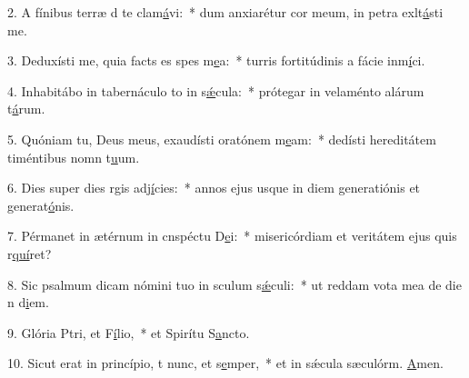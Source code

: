 2. A fínibus terræ d te clam\uline{á}vi:~* dum anxiarétur cor meum, in petra exlt\uline{á}sti me.\par 
3. Deduxísti me, quia facts es spes m\uline{e}a:~* turris fortitúdinis a fácie inm\uline{í}ci.\par 
4. Inhabitábo in tabernáculo to in s\uline{ǽ}cula:~* prótegar in velaménto alárum t\uline{á}rum.\par 
5. Quóniam tu, Deus meus, exaudísti oratónem m\uline{e}am:~* dedísti hereditátem timéntibus nomn t\uline{u}um.\par 
6. Dies super dies rgis adj\uline{í}cies:~* annos ejus usque in diem generatiónis et generat\uline{ó}nis.\par 
7. Pérmanet in ætérnum in cnspéctu D\uline{e}i:~* misericórdiam et veritátem ejus quis r\uline{quí}ret?\par 
8. Sic psalmum dicam nómini tuo in sculum s\uline{ǽ}culi:~* ut reddam vota mea de die n d\uline{i}em.\par 
9. Glória Ptri, et F\uline{í}lio,~* et Spirítu S\uline{a}ncto.\par 
10. Sicut erat in princípio, t nunc, et s\uline{e}mper,~* et in sǽcula sæculórm. \uline{A}men.\par 
